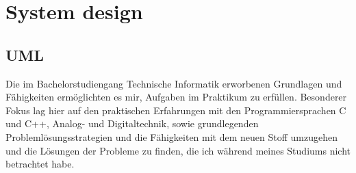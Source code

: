 \chapter{System design}
\section{UML}
\label{sec:uml}
Die im Bachelorstudiengang Technische Informatik erworbenen Grundlagen und Fähigkeiten ermöglichten es mir, Aufgaben im Praktikum zu erfüllen. Besonderer Fokus lag hier auf den praktischen Erfahrungen mit den Programmiersprachen C und C++, Analog- und Digitaltechnik, sowie grundlegenden Problemlösungsstrategien und die Fähigkeiten mit dem neuen Stoff umzugehen und die Lösungen der Probleme zu finden, die ich während meines Studiums nicht betrachtet habe.
